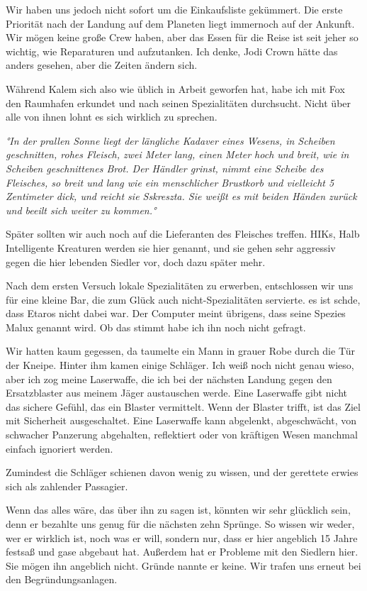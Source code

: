 \documentclass[11pt]{scrartcl}
\begin{document}
Wir haben uns jedoch nicht sofort um die Einkaufsliste gekümmert. Die
erste Priorität nach der Landung auf dem Planeten liegt immernoch auf
der Ankunft. Wir mögen keine große Crew haben, aber das Essen für die
Reise ist seit jeher so wichtig, wie Reparaturen und aufzutanken. Ich
denke, Jodi Crown hätte das anders gesehen, aber die Zeiten ändern sich.

Während Kalem sich also wie üblich in Arbeit geworfen hat, habe ich mit
Fox den Raumhafen erkundet und nach seinen Spezialitäten durchsucht.
Nicht über alle von ihnen lohnt es sich wirklich zu sprechen.

\emph{°In der prallen Sonne liegt der längliche Kadaver eines Wesens, in
Scheiben geschnitten, rohes Fleisch, zwei Meter lang, einen Meter hoch
und breit, wie in Scheiben geschnittenes Brot. Der Händler grinst, nimmt
eine Scheibe des Fleisches, so breit und lang wie ein menschlicher
Brustkorb und vielleicht 5 Zentimeter dick, und reicht sie Sskreszta.
Sie weißt es mit beiden Händen zurück und beeilt sich weiter zu
kommen.°}

Später sollten wir auch noch auf die Lieferanten des Fleisches treffen.
HIKs, Halb Intelligente Kreaturen werden sie hier genannt, und sie gehen
sehr aggressiv gegen die hier lebenden Siedler vor, doch dazu später
mehr.

Nach dem ersten Versuch lokale Spezialitäten zu erwerben, entschlossen
wir uns für eine kleine Bar, die zum Glück auch nicht-Spezialitäten
servierte. es ist schde, dass Etaros nicht dabei war. Der Computer meint
übrigens, dass seine Spezies Malux genannt wird. Ob das stimmt habe ich
ihn noch nicht gefragt.

Wir hatten kaum gegessen, da taumelte ein Mann in grauer Robe durch die
Tür der Kneipe. Hinter ihm kamen einige Schläger. Ich weiß noch nicht
genau wieso, aber ich zog meine Laserwaffe, die ich bei der nächsten
Landung gegen den Ersatzblaster aus meinem Jäger austauschen werde. Eine
Laserwaffe gibt nicht das sichere Gefühl, das ein Blaster vermittelt.
Wenn der Blaster trifft, ist das Ziel mit Sicherheit ausgeschaltet. Eine
Laserwaffe kann abgelenkt, abgeschwächt, von schwacher Panzerung
abgehalten, reflektiert oder von kräftigen Wesen manchmal einfach
ignoriert werden.

Zumindest die Schläger schienen davon wenig zu wissen, und der gerettete
erwies sich als zahlender Passagier.

Wenn das alles wäre, das über ihn zu sagen ist, könnten wir sehr
glücklich sein, denn er bezahlte uns genug für die nächsten zehn
Sprünge. So wissen wir weder, wer er wirklich ist, noch was er will,
sondern nur, dass er hier angeblich 15 Jahre festsaß und gase abgebaut
hat. Außerdem hat er Probleme mit den Siedlern hier. Sie mögen ihn
angeblich nicht. Gründe nannte er keine. Wir trafen uns erneut bei den
Begründungsanlagen.
\end{document}

